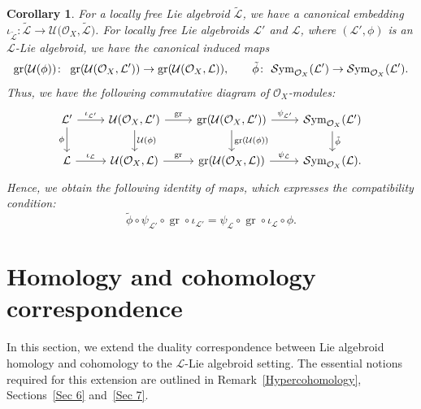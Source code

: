 \documentclass[pdftex]{sigma}
\numberwithin{equation}{section}
\newtheorem{Cor}[Thm]{Corollary}
\theoremstyle{definition}
\begin{document}
	\begin{Cor} For a locally free Lie algebroid $\tilde{\mathcal{L}}$, we have a canonical embedding $\iota_{\tilde{\mathcal{L}}}\colon \tilde{\mathcal{L}} \rightarrow \mathcal{U}\bigl(\mathcal{O}_X, \tilde{\mathcal{L}}\bigr)$.
	For locally free Lie algebroids $\mathcal{L}'$ and $\mathcal{L}$, where $(\mathcal{L}', \phi)$ is an $\mathcal{L}$-Lie algebroid, we have the canonical induced maps
\begin{gather*}
\operatorname{gr}(\mathcal{U}(\phi))\colon \ \operatorname{gr}(\mathcal{U}(\mathcal{O}_X, \mathcal{L}')) \rightarrow \operatorname{gr}(\mathcal{U}(\mathcal{O}_X, \mathcal{L})),
\qquad
\tilde{\phi}\colon \ \mathcal{S}{\rm ym}_{\mathcal{O}_X}(\mathcal{L}') \rightarrow \mathcal{S}{\rm ym}_{\mathcal{O}_X}(\mathcal{L}').
\end{gather*}
	Thus, we have the following commutative diagram of $\mathcal{O}_X$-modules:
	\[
	\begin{tikzcd}
		\mathcal{L}' \arrow{r}{\iota_{\mathcal{L}'}}\arrow[swap]{d}{\phi} & \mathcal{U}(\mathcal{O}_X, \mathcal{L}') \arrow{d}{\mathcal{U}(\phi)} \arrow{r}{{\rm gr}} & \operatorname{gr}(\mathcal{U}(\mathcal{O}_X, \mathcal{L}')) \arrow{d}{\operatorname{gr}(\mathcal{U}(\phi))} \arrow{r}{\psi_{\mathcal{L}'}} & \mathcal{S}{\rm ym}_{\mathcal{O}_X}(\mathcal{L}') \arrow{d}{\tilde{\phi}} \\
		\mathcal{L} \arrow{r}{\iota_{\mathcal{L}}} & \mathcal{U}(\mathcal{O}_X, \mathcal{L}) \arrow{r}{{\rm gr}} & \operatorname{gr}(\mathcal{U}(\mathcal{O}_X, \mathcal{L})) \arrow{r}{\psi_{\mathcal{L}}} &
		\mathcal{S}{\rm ym}_{\mathcal{O}_X}(\mathcal{L}).
	\end{tikzcd}
	\]
	Hence, we obtain the following identity of maps, which expresses the compatibility condition:
\[
\tilde{\phi}\circ \psi_{\mathcal{L}'}\circ \operatorname{gr} \circ \iota_{\mathcal{L}'}= \psi_{\mathcal{L}}\circ \operatorname{gr} \circ \iota_{\mathcal{L}} \circ \phi.
\]
\end{Cor}

\section{Homology and cohomology correspondence} \label{Sec 8}
In this section, we extend the duality correspondence between Lie algebroid homology and cohomology \cite{AW-EL,JH1, JH2, PX} to the $\mathcal{L}$-Lie algebroid setting. The essential notions required for this extension are outlined in Remark~\ref{Hypercohomology}, Sections~\ref{Sec 6} and~\ref{Sec 7}.
\end{document}
